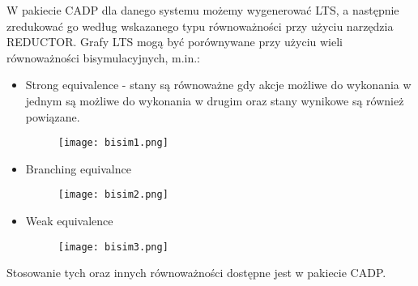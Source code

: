 \documentclass[a4paper,15pt]{article}
\begin{document}
W pakiecie CADP dla danego systemu możemy wygenerować LTS, a następnie zredukować go według wskazanego typu równoważności przy użyciu narzędzia REDUCTOR. Grafy LTS mogą być porównywane przy użyciu wieli równoważności bisymulacyjnych, m.in.: 
\begin{itemize}
\item Strong equivalence - stany są równoważne gdy akcje możliwe do wykonania w jednym są możliwe do wykonania w drugim oraz stany wynikowe są również powiązane.

\begin{figure}[H]
\centerline{\texttt{[image: bisim1.png]}}
\end{figure}
 
\item Branching equivalnce
\begin{figure}[H]
\centerline{\texttt{[image: bisim2.png]}}
\end{figure}
 
 
\item Weak equivalence 
\begin{figure}[H]
\centerline{\texttt{[image: bisim3.png]}}
\end{figure}


\end{itemize}
Stosowanie tych oraz innych równoważności dostępne jest w pakiecie CADP.
\end{document}
